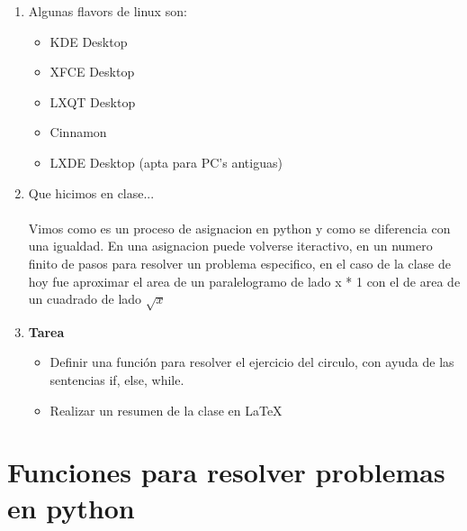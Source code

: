 \documentclass{book}
\begin{document}
\begin{enumerate}
\begin{itemize}
	\end{itemize}%
	\item Algunas flavors de linux son:
	\begin{itemize}
		\item KDE Desktop
		\item XFCE Desktop
		\item LXQT Desktop
		\item Cinnamon
		\item LXDE Desktop (apta para PC's antiguas)
	\end{itemize}
	\item Que hicimos en clase... \\
	\\
	Vimos como es un proceso de asignacion en python y como se diferencia con una igualdad. En una asignacion puede volverse iteractivo, en un numero finito de pasos para resolver un problema especifico, en el caso de la clase de hoy fue aproximar el area de un paralelogramo de lado x * 1 con el de area de un cuadrado de lado $\sqrt{x}$
	\item \textbf{Tarea}
	\begin{itemize}
		\item Definir una función para resolver el ejercicio del circulo, con ayuda de las sentencias if, else, while.
		\item Realizar un resumen de la clase en LaTeX
		
		
	\end{itemize}
	
	
	
\end{enumerate}%




\section{Funciones para resolver problemas en python}%
\begin{flushright}
	\date{15 de enero de 2019}
\end{flushright}
\end{document}

